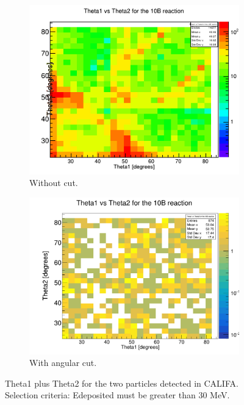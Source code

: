 \documentclass{report}
\begin{document}
\begin{figure}[ht]
\begin{subfigure}{.5\textwidth}
  \centering
  \includegraphics[width=\linewidth]{theta1_vs_theta2_10B.png}
  \caption{Without cut.}
  \label{fig:sub-first}
\end{subfigure}
\begin{subfigure}{.5\textwidth}
  \centering
  \includegraphics[width=\linewidth]{theta1_vs_theta2_10B_tpat.png}
  \caption{With angular cut.}
  \label{fig:sub-second}
\end{subfigure}
        \caption{Theta1 plus Theta2 for the two particles detected in CALIFA. Selection criteria: E\textunderscore deposited must be greater than 30 MeV.}
\label{fig:theta1_vs_theta2_10B_tpat}
\end{figure}
\end{document}
